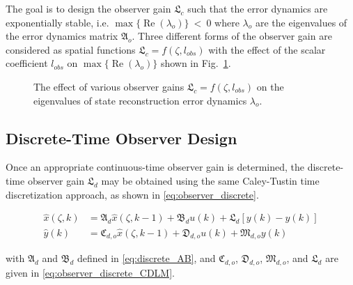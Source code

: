 The goal is to design the observer gain $\mathfrak{L}_c$ such that the error dynamics are exponentially stable, i.e. $\max\{\operatorname{Re}(\lambda_{o})\}~<~0$ where $\lambda_{o}$ are the eigenvalues of the error dynamics matrix $\mathfrak{A}_o$. Three different forms of the observer gain are considered as spatial functions $\mathfrak{L}_c = f(\zeta, l_{obs})$ with the effect of the scalar coefficient $l_{obs}$ on $\max\{\operatorname{Re}(\lambda_{o})\}$ shown in Fig.~\ref{fig:L_vs_lambda}.

\begin{figure}[!htbp]
    \centering
    
    \caption{The effect of various observer gains $\mathfrak{L}_c = f(\zeta, l_{obs})$ on the eigenvalues of state reconstruction error dynamics $\lambda_o$.}
    \label{fig:L_vs_lambda}
\end{figure}


\subsection{Discrete-Time Observer Design}

Once an appropriate continuous-time observer gain is determined, the discrete-time observer gain $\mathfrak{L}_d$ may be obtained using the same Caley-Tustin time discretization approach, as shown in \eqref{eq:observer_discrete}.

\begin{equation} \label{eq:observer_discrete}
    \begin{aligned}
        \hat{x}(\zeta, k) &= \mathfrak{A}_d \hat{x}(\zeta, k-1) + \mathfrak{B}_d u(k) + \mathfrak{L}_d [y(k) - \hat{y}(k)] \\
        \hat{y}(k) &= \mathfrak{C}_{d,o} \hat{x}(\zeta, k-1) + \mathfrak{D}_{d,o} u(k) + \mathfrak{M}_{d,o} y(k)
    \end{aligned}
\end{equation}

with $\mathfrak{A}_d$ and $\mathfrak{B}_d$ defined in \eqref{eq:discrete_AB}, and $\mathfrak{C}_{d,o}$, $\mathfrak{D}_{d,o}$, $\mathfrak{M}_{d,o}$, and $\mathfrak{L}_d$ are given in \eqref{eq:observer_discrete_CDLM}.

